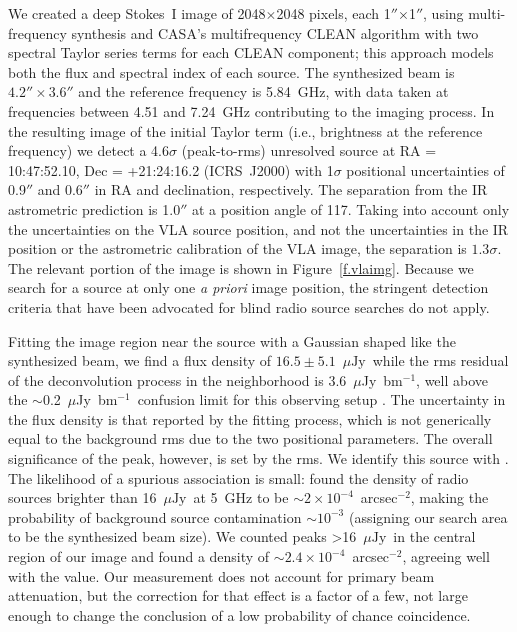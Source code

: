 \documentclass[iop]{emulateapj}
\newcommand\citeeg[1]{\citep[e.g.,][]{#1}}
\newcommand\ujy{\ensuremath{\mu\text{Jy}}}
\newcommand\ujybm{$\mu$Jy~bm$^{-1}$}
\newcommand\vtwom{2M\,1047+21} %
\newcommand\twom{\object{\vtwom}}
\newcommand\apx{\ensuremath{\sim}}
\begin{document}
We created a deep Stokes~I image of 2048$\times$2048 pixels, each
1$''$$\times$1$''$, using multi-frequency synthesis \citep{themfs} and CASA's
multifrequency CLEAN algorithm with two spectral Taylor series terms for each
CLEAN component; this approach models both the flux and spectral index of each
source. The synthesized beam is $4.2'' \times 3.6''$ and the reference
frequency is 5.84~GHz, with data taken at frequencies between 4.51 and
7.24~GHz contributing to the imaging process. In the resulting image of the
initial Taylor term (i.e., brightness at the reference frequency) we detect a
4.6$\sigma$ (peak-to-rms) unresolved source at RA = 10:47:52.10, Dec =
+21:24:16.2 (ICRS~J2000) with 1$\sigma$ positional uncertainties of 0.9$''$
and 0.6$''$ in RA and declination, respectively. The separation from the IR
astrometric prediction is 1.0$''$ at a position angle of 117\degr. Taking into
account only the uncertainties on the VLA source position, and not the
uncertainties in the IR position or the astrometric calibration of the VLA
image, the separation is $1.3\sigma$. The relevant portion of the image is
shown in Figure~\ref{f.vlaimg}. Because we search for a source at only one
\textit{a priori} image position, the stringent detection criteria that have
been advocated for blind radio source searches \citeeg{fko+12} do not apply.

Fitting the image region near the source with a Gaussian shaped like the
synthesized beam, we find a flux density of $16.5 \pm 5.1$~\ujy\ while the rms
residual of the deconvolution process in the neighborhood is 3.6~\ujybm, well
above the \apx0.2~\ujybm\ confusion limit for this observing setup
\citep{c02}. The uncertainty in the flux density is that reported by the
fitting process, which is not generically equal to the background rms due to
the two positional parameters. The overall significance of the peak, however,
is set by the rms. We identify this source with \twom. The likelihood of a
spurious association is small: \citet{fwkk91} found the density of radio
sources brighter than 16~\ujy\ at 5~GHz to be
\apx$2\times10^{-4}$~arcsec$^{-2}$, making the probability of background
source contamination \apx$10^{-3}$ (assigning our search area to be the
synthesized beam size). We counted peaks >16~\ujy\ in the central region of
our image and found a density of \apx $2.4\times10^{-4}$~arcsec$^{-2}$,
agreeing well with the \citet{fwkk91} value. Our measurement does not account
for primary beam attenuation, but the correction for that effect is a factor
of a few, not large enough to change the conclusion of a low probability of
chance coincidence.
\end{document}
